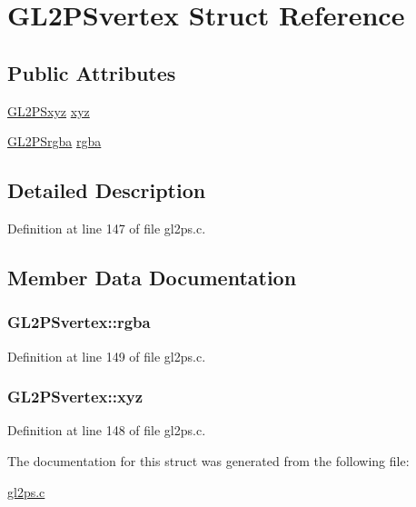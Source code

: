 \hypertarget{struct_g_l2_p_svertex}{}\section{G\+L2\+P\+Svertex Struct Reference}
\label{struct_g_l2_p_svertex}
\subsection*{Public Attributes}
\begin{DoxyCompactItemize}
\item 
\hyperlink{gl2ps_8c_ac84fdfdcca7fbd2c8a63f1a2294cb4ec}{G\+L2\+P\+Sxyz} \hyperlink{struct_g_l2_p_svertex_a7405cb6a7f0f6092fca2e92de0a9f28a}{xyz}
\item 
\hyperlink{gl2ps_8h_a8e362d2f509289c8a074fa745816df9d}{G\+L2\+P\+Srgba} \hyperlink{struct_g_l2_p_svertex_a923a23c4c99305e94d2c5b90b940183c}{rgba}
\end{DoxyCompactItemize}


\subsection{Detailed Description}


Definition at line 147 of file gl2ps.\+c.



\subsection{Member Data Documentation}
\hypertarget{struct_g_l2_p_svertex_a923a23c4c99305e94d2c5b90b940183c}{}
\subsubsection[{rgba}]{ G\+L2\+P\+Svertex\+::rgba}\label{struct_g_l2_p_svertex_a923a23c4c99305e94d2c5b90b940183c}


Definition at line 149 of file gl2ps.\+c.

\hypertarget{struct_g_l2_p_svertex_a7405cb6a7f0f6092fca2e92de0a9f28a}{}
\subsubsection[{xyz}]{ G\+L2\+P\+Svertex\+::xyz}\label{struct_g_l2_p_svertex_a7405cb6a7f0f6092fca2e92de0a9f28a}


Definition at line 148 of file gl2ps.\+c.



The documentation for this struct was generated from the following file\+:\begin{DoxyCompactItemize}
\item 
\hyperlink{gl2ps_8c}{gl2ps.\+c}\end{DoxyCompactItemize}
